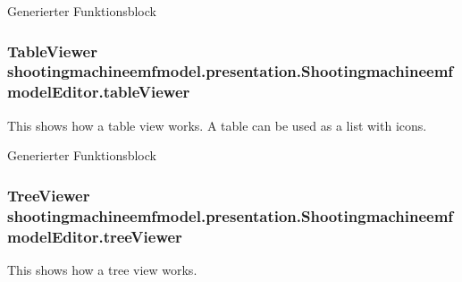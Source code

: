 Generierter Funktionsblock \hypertarget{classshootingmachineemfmodel_1_1presentation_1_1_shootingmachineemfmodel_editor_abf98592a7b8f3d7e86e4845abe367745}{
\subsubsection[{table\-Viewer}]{\setlength{\rightskip}{0pt plus 5cm}Table\-Viewer shootingmachineemfmodel.\-presentation.\-Shootingmachineemfmodel\-Editor.\-table\-Viewer\hspace{0.3cm}{\ttfamily [protected]}}}\label{classshootingmachineemfmodel_1_1presentation_1_1_shootingmachineemfmodel_editor_abf98592a7b8f3d7e86e4845abe367745}
This shows how a table view works. A table can be used as a list with icons.

Generierter Funktionsblock \hypertarget{classshootingmachineemfmodel_1_1presentation_1_1_shootingmachineemfmodel_editor_a451c83523c3d5b93f77f69d72af9d811}{
\subsubsection[{tree\-Viewer}]{\setlength{\rightskip}{0pt plus 5cm}Tree\-Viewer shootingmachineemfmodel.\-presentation.\-Shootingmachineemfmodel\-Editor.\-tree\-Viewer\hspace{0.3cm}{\ttfamily [protected]}}}\label{classshootingmachineemfmodel_1_1presentation_1_1_shootingmachineemfmodel_editor_a451c83523c3d5b93f77f69d72af9d811}
This shows how a tree view works.

